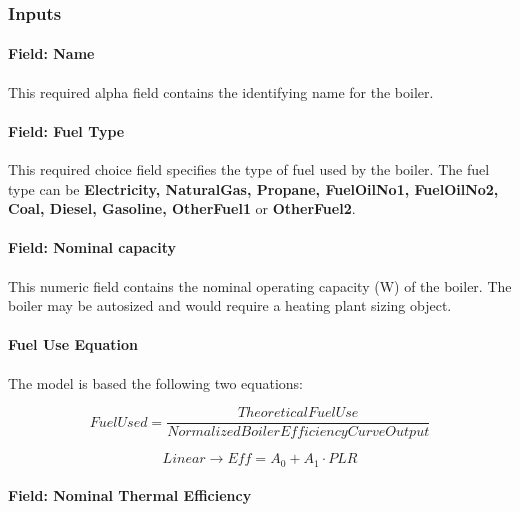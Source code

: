 \subsubsection{Inputs}\label{inputs-10-013}

\paragraph{Field: Name}\label{field-name-9-012}

This required alpha field contains the identifying name for the boiler.

\paragraph{Field: Fuel Type}\label{field-fuel-type-3-000}

This required choice field specifies the type of fuel used by the boiler. The fuel type can be \textbf{Electricity, NaturalGas, Propane, FuelOilNo1, FuelOilNo2, Coal, Diesel, Gasoline, OtherFuel1} or \textbf{OtherFuel2}.

\paragraph{Field: Nominal capacity}\label{field-nominal-capacity-6}

This numeric field contains the nominal operating capacity (W) of the boiler. The boiler may be autosized and would require a heating plant sizing object.

\paragraph{Fuel Use Equation}\label{fuel-use-equation}

The model is based the following two equations:

\begin{equation}
    FuelUsed = \frac{{TheoreticalFuelUse}}{{NormalizedBoilerEfficiencyCurveOutput}}
\end{equation}

\begin{equation}
    Linear \to Eff = {A_0} + {A_1}\cdot PLR
\end{equation}

\paragraph{Field: Nominal Thermal Efficiency}\label{field-nominal-thermal-efficiency}

